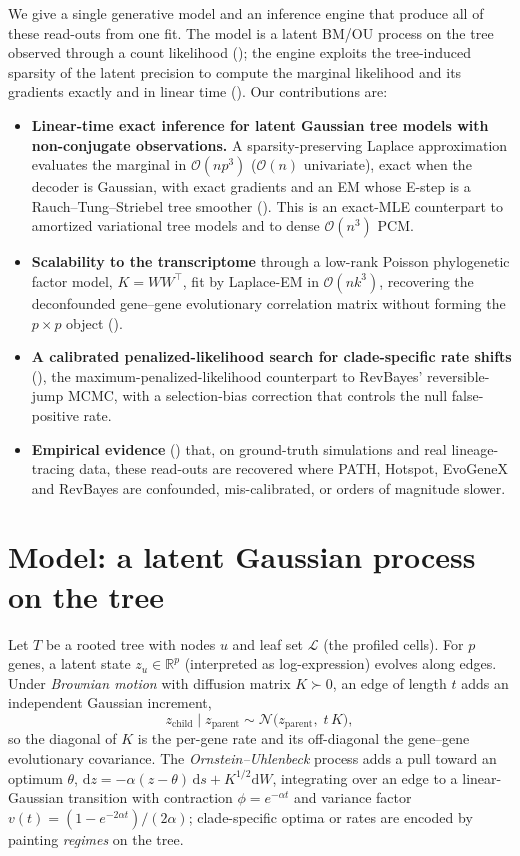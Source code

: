 \documentclass[11pt]{article}
\newcommand{\RR}{\mathbb{R}}
\newcommand{\N}{\mathcal{N}}
\newcommand{\bigO}{\mathcal{O}}
\begin{document}
We give a single generative model and an inference engine that produce all of these read-outs
from one fit. The model is a latent BM/OU process on the tree observed through a count
likelihood (); the engine exploits the tree-induced sparsity of the latent
precision to compute the marginal likelihood and its gradients exactly and in linear time
(). Our contributions are:
\begin{itemize}
  \item \textbf{Linear-time exact inference for latent Gaussian tree models with non-conjugate
  observations.} A sparsity-preserving Laplace approximation evaluates the marginal in
  $\bigO(np^3)$ ($\bigO(n)$ univariate), exact when the decoder is Gaussian, with exact
  gradients and an EM whose E-step is a Rauch--Tung--Striebel tree smoother
  (). This is an exact-MLE counterpart to amortized variational tree
  models and to dense $\bigO(n^3)$ PCM.
  \item \textbf{Scalability to the transcriptome} through a low-rank Poisson phylogenetic
  factor model, $K=WW^\top$, fit by Laplace-EM in $\bigO(nk^3)$, recovering the deconfounded
  gene--gene evolutionary correlation matrix without forming the $p\times p$ object
  ().
  \item \textbf{A calibrated penalized-likelihood search for clade-specific rate shifts}
  (), the maximum-penalized-likelihood counterpart to RevBayes'
  reversible-jump MCMC, with a selection-bias correction that controls the null false-positive
  rate.
  \item \textbf{Empirical evidence} () that, on ground-truth
  simulations and real lineage-tracing data, these read-outs are recovered where PATH,
  Hotspot, EvoGeneX and RevBayes are confounded, mis-calibrated, or orders of magnitude
  slower.
\end{itemize}

\section{Model: a latent Gaussian process on the tree}
\label{sec:model}

Let $T$ be a rooted tree with nodes $u$ and leaf set $\mathcal L$ (the profiled cells). For
$p$ genes, a latent state $z_u\in\RR^p$ (interpreted as log-expression) evolves along edges.
Under \emph{Brownian motion} with diffusion matrix $K\succ 0$, an edge of length $t$ adds an
independent Gaussian increment,
\begin{equation}
z_{\text{child}}\mid z_{\text{parent}} \sim \N\!\big(z_{\text{parent}},\; t\,K\big),
\label{eq:bm}
\end{equation}
so the diagonal of $K$ is the per-gene rate and its off-diagonal the gene--gene evolutionary
covariance. The \emph{Ornstein--Uhlenbeck} process adds a pull toward an optimum $\theta$,
$\mathrm dz=-\alpha(z-\theta)\,\mathrm ds+K^{1/2}\mathrm dW$, integrating over an edge to a
linear-Gaussian transition with contraction $\phi=e^{-\alpha t}$ and variance factor
$v(t)=(1-e^{-2\alpha t})/(2\alpha)$; clade-specific optima or rates are encoded by painting
\emph{regimes} on the tree.
\end{document}
